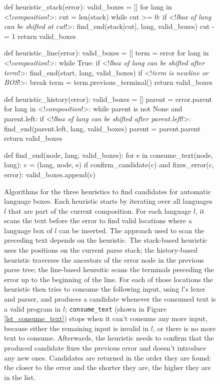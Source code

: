 \documentclass[sigplan,screen]{acmart}\settopmatter{printfolios=true,printccs=false,printacmref=false}
\begin{document}
\begin{figure}[t]
\begin{minipage}[t]{0.49\textwidth}
\begin{lstdefault}[]
def heuristic_stack(error):
  valid_boxes = []
  for lang in <!\textit{composition}!>:
    cut = len(stack)
    while cut >= 0:
      if <!\textit{lbox of lang can be shifted at cut}!>:
        find_end(stack[cut], lang, valid_boxes)
      cut -= 1
  return valid_boxes

def heuristic_line(error):
  valid_boxes = []
  term = error
  for lang in <!\textit{composition}!>:
    while True:
      if <!\textit{lbox of lang can be shifted after term}!>:
        find_end(start, lang, valid_boxes)
      if <!\textit{term is newline or BOS}!>:
        break
      term = term.previous_terminal()
  return valid_boxes
\end{lstdefault}
\end{minipage}
\begin{minipage}[t]{0.49\textwidth}
\begin{lstdefault}[firstnumber=23]
def heuristic_history(error):
  valid_boxes = []
  parent = error.parent
  for lang in <!\textit{composition}!>:
    while parent is not None and parent.left:
      if <!\textit{lbox of lang can be shifted after parent.left}!>:
        find_end(parent.left, lang, valid_boxes)
      parent = parent.parent
  return valid_boxes

def find_end(node, lang, valid_boxes):
  for e in consume_text(node, lang):
    c = (lang, node, e)
    if confirm_candidate(c) and fixes_error(c, error):
      valid_boxes.append(c)
\end{lstdefault}
\end{minipage}
\caption{
Algorithms for the three heuristics to find candidates for automatic language
boxes. Each heuristic starts by iterating over all languages $l$ that are part
of the current composition. For each language $l$, it scans the text
before the error to find valid locations where a language box of $l$ can be
inserted. The approach used to scan the preceding text depends on the heuristic.
The stack-based heuristic uses the positions on the current parse stack; the
history-based heuristic traverses the ancestors of the error node in the previous
parse tree; the line-based heursitic scans the terminals preceding the error up to the
beginning of the line.
For each of
those locations the heuristic then tries to consume the following input, using $l$'s lexer and
parser, and produces a candidate whenever the consumed text is a valid program in
$l$; \texttt{consume\_text} (shown in Figure \ref{lst_consume_text}) stops when it can't consume any more input, because either the remaining
input is invalid in $l$, or there is no more text to consume. Afterwards, the heuristic needs to
confirm that the produced candidate fixes the previous error and
doesn't introduce any new ones.
Candidates are returned in the order they are found: the closer to the error and
the shorter they are, the higher they are in the list.}
\label{lst_find_candidates}
\end{figure}
\end{document}
